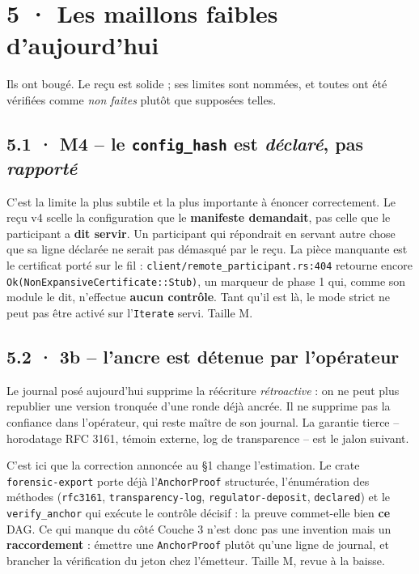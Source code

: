 \documentclass[10pt]{article}
\newcommand{\sz}[1]{{\small\color{grey}\textsf{#1}}}
\newcommand{\code}[1]{\texttt{\small #1}}
\begin{document}
\section{5 · Les maillons faibles d'aujourd'hui}

Ils ont bougé. Le reçu est solide ; ses limites sont nommées, et toutes ont été vérifiées comme
\emph{non faites} plutôt que supposées telles.

\subsection{5.1 · M4 -- le \code{config\_hash} est \emph{déclaré}, pas \emph{rapporté}}

C'est la limite la plus subtile et la plus importante à énoncer correctement. Le reçu v4 scelle la
configuration que le \textbf{manifeste demandait}, pas celle que le participant a \textbf{dit servir}.
Un participant qui répondrait en servant autre chose que sa ligne déclarée ne serait pas démasqué par
le reçu. La pièce manquante est le certificat porté sur le fil : \code{client/remote\_participant.rs:404}
retourne encore \code{Ok(NonExpansiveCertificate::Stub)}, un marqueur de phase 1 qui, comme son
module le dit, n'effectue \textbf{aucun contrôle}. Tant qu'il est là, le mode strict ne peut pas être
activé sur l'\code{Iterate} servi. \sz{Taille M.}

\subsection{5.2 · 3b -- l'ancre est détenue par l'opérateur}

Le journal posé aujourd'hui supprime la réécriture \emph{rétroactive} : on ne peut plus republier une
version tronquée d'une ronde déjà ancrée. Il ne supprime pas la confiance dans l'opérateur, qui reste
maître de son journal. La garantie tierce -- horodatage RFC 3161, témoin externe, log de transparence --
est le jalon suivant.

C'est ici que la correction annoncée au §1 change l'estimation. Le crate \code{forensic-export} porte
déjà l'\code{AnchorProof} structurée, l'énumération des méthodes (\code{rfc3161},
\code{transparency-log}, \code{regulator-deposit}, \code{declared}) et le \code{verify\_anchor} qui
exécute le contrôle décisif : la preuve commet-elle bien \textbf{ce} DAG. Ce qui manque du côté
Couche 3 n'est donc pas une invention mais un \textbf{raccordement} : émettre une \code{AnchorProof}
plutôt qu'une ligne de journal, et brancher la vérification du jeton chez l'émetteur. \sz{Taille M,
revue à la baisse.}
\end{document}
